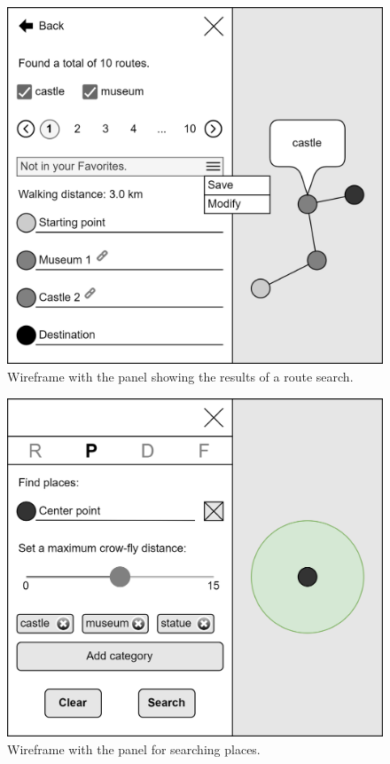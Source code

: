 \begin{figure}
\centering
\includegraphics[width=0.67\linewidth]{img/design/ui-result-routes.png}
\caption{Wireframe with the panel showing the results of a route search.}
\label{fig:ui-result-routes}
\end{figure}

\clearpage

\begin{figure}
\centering
\includegraphics[width=0.67\linewidth]{img/design/ui-search-places.png}
\caption{Wireframe with the panel for searching places.}
\label{fig:ui-search-places}
\end{figure}

